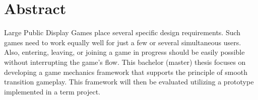\chapter{Abstract}

Large Public Display Games place several specific design requirements. Such
games need to work equally well for just a few or several simultaneous users.
Also, entering, leaving, or joining a game in progress should be easily possible
without interrupting the game's flow. This bachelor (master) thesis focuses on
developing a game mechanics framework that supports the principle of smooth
transition gameplay. This framework will then be evaluated utilizing a prototype
implemented in a term project.
